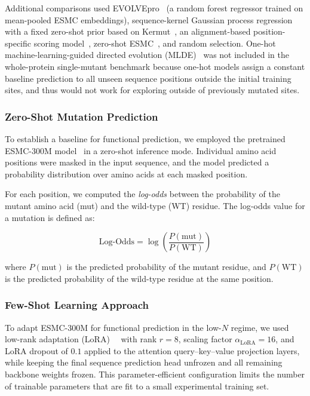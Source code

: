 \documentclass[sn-nature]{sn-jnl}
\begin{document}
    Additional comparisons used EVOLVEpro~\cite{jiang2024rapid} (a random forest regressor trained on mean-pooled ESMC embeddings), sequence-kernel Gaussian process regression with a fixed zero-shot prior based on Kermut~\cite{groth2024kermut}, an alignment-based position-specific scoring model~\cite{gribskov1987profile}, zero-shot ESMC~\cite{esm2024cambrian}, and random selection. One-hot machine-learning-guided directed evolution (MLDE)~\cite{wu2019machine} was not included in the whole-protein single-mutant benchmark because one-hot models assign a constant baseline prediction to all unseen sequence positions outside the initial training sites, and thus would not work for exploring outside of previously mutated sites.

    \subsubsection{Zero-Shot Mutation Prediction}
    To establish a baseline for functional prediction, we employed the pretrained ESMC-300M model~\cite{esm2024cambrian} in a zero-shot inference mode. Individual amino acid positions were masked in the input sequence, and the model predicted a probability distribution over amino acids at each masked position.
    
    For each position, we computed the \textit{log-odds} between the probability of the mutant amino acid (mut) and the wild-type (WT) residue. The log-odds value for a mutation is defined as:
    
    \[
    \text{Log-Odds} = \log \left( \frac{P(\text{mut})}{P(\text{WT})} \right)
    \]
    
    where \(P(\text{mut})\) is the predicted probability of the mutant residue, and \(P(\text{WT})\) is the predicted probability of the wild-type residue at the same position.
    
    \subsubsection{Few-Shot Learning Approach}
    To adapt ESMC-300M for functional prediction in the low-$N$ regime, we used low-rank adaptation (LoRA)~~\cite{hu2022lora} with rank $r = 8$, scaling factor $\alpha_{\text{LoRA}} = 16$, and LoRA dropout of $0.1$ applied to the attention query--key--value projection layers, while keeping the final sequence prediction head unfrozen and all remaining backbone weights frozen. This parameter-efficient configuration limits the number of trainable parameters that are fit to a small experimental training set.
\end{document}
